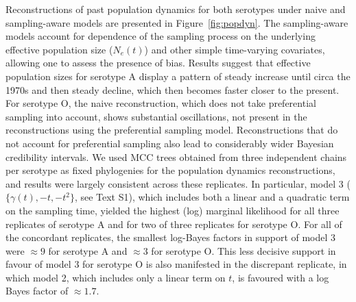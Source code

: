 \documentclass[10pt]{article}
\begin{document}
Reconstructions of past population dynamics for both serotypes under naive and sampling-aware models are presented in Figure~\ref{fig:popdyn}.
The sampling-aware models account for dependence of the sampling process on the underlying effective population size ($N_e(t)$) and other simple time-varying covariates, allowing one to assess the presence of bias.
Results suggest that effective population sizes for serotype A display a pattern of steady increase until circa the 1970s and then steady decline, which then becomes faster closer to the present.
For serotype O, the naive reconstruction, which does not take preferential sampling into account, shows substantial oscillations, not present in the reconstructions using %
the preferential sampling model.
Reconstructions that do not account for preferential sampling also lead to considerably wider Bayesian credibility intervals.
We used MCC trees obtained from three independent chains per serotype as fixed phylogenies for the population dynamics reconstructions, and results were largely consistent across these replicates. %
In particular, model 3 ($\{\gamma(t), -t, -t^2\}$, see Text S1), which includes both a linear and a quadratic term on the sampling time, yielded the highest (log) marginal likelihood for all three replicates of serotype A and for two of three replicates for serotype O. %
For all of the concordant replicates, the smallest log-Bayes factors in support of model 3 were $\approx 9$ for serotype A and $\approx 3$ for serotype O.
This less decisive support in favour of model 3 for serotype O is also manifested in the discrepant replicate, in which model 2, which includes only a linear term on $t$, is favoured with a log Bayes factor of $\approx 1.7$. %
\end{document}
